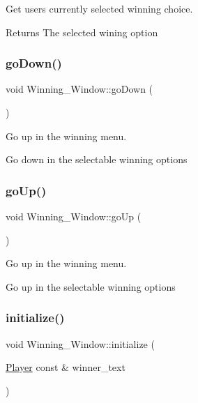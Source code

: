 Get user\textquotesingle{}s currently selected winning choice. 

\begin{DoxyReturn}{Returns}
The selected wining option 
\end{DoxyReturn}
\mbox{\label{classWinning__Window_ac6d149dfb7cd9c8978117eecd70a3923}} 
\subsubsection{\texorpdfstring{go\+Down()}{goDown()}}
{\footnotesize\ttfamily void Winning\+\_\+\+Window\+::go\+Down (\begin{DoxyParamCaption}{ }\end{DoxyParamCaption})}



Go up in the winning menu. 

Go down in the selectable winning options \mbox{\label{classWinning__Window_a93f258448a7ab61ec6931e7bfb25b614}} 
\subsubsection{\texorpdfstring{go\+Up()}{goUp()}}
{\footnotesize\ttfamily void Winning\+\_\+\+Window\+::go\+Up (\begin{DoxyParamCaption}{ }\end{DoxyParamCaption})}



Go up in the winning menu. 

Go up in the selectable winning options \mbox{\label{classWinning__Window_a3382d7cac361e9909851407bf27efa58}} 
\subsubsection{\texorpdfstring{initialize()}{initialize()}}
{\footnotesize\ttfamily void Winning\+\_\+\+Window\+::initialize (\begin{DoxyParamCaption}\item[{\hyperlink{classPlayer}{Player} const \&}]{winner_text }\end{DoxyParamCaption})}



